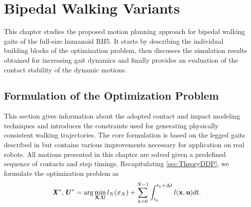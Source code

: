 
\chapter{Bipedal Walking Variants}\label{c4}
This chapter studies the proposed motion planning approach for bipedal walking gaits of the full-size humanoid RH5. It starts by describing the individual building blocks of the optimization problem, then discusses the simulation results obtained for increasing gait dynamics and finally provides an evaluation of the contact stability of the dynamic motions.

\section{Formulation of the Optimization Problem}\label{sec:BipedFormulation}
This section gives information about the adopted contact and impact modeling techniques and introduces the constraints used for generating physically consistent walking trajectories. The core formulation is based on the legged gaits described in \cite{mastalli20crocoddyl} but contains various improvements necessary for application on real robots. All motions presented in this chapter are solved given a predefined sequence of contacts and step timings. 
Recapitulating \cref{sec:TheoryDDP}, we formulate the optimization problem as
\begin{equation}\label{eqn:optimizationProblem}
\bm{\mathit{X}}^*,\bm{\mathit{U}}^*= 
\arg\min_{\mathbf{X},\mathbf{U}} l_N(x_N)+\sum_{k=0}^{N-1} \int_{t_k}^{t_k+\Delta t} l(\mathbf{x},\mathbf{u})dt. 
\end{equation}

